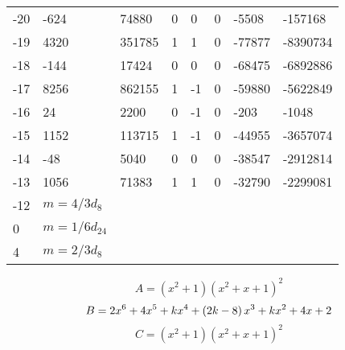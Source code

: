 \documentclass{amsart}
\begin{document}
\begin{longtable}{|l|l|l|lllll|}
-20&-624&74880&0&0&0&-5508&-157168\\
-19&4320&351785&1&1&0&-77877&-8390734\\
-18&-144&17424&0&0&0&-68475&-6892886\\
-17&8256&862155&1&-1&0&-59880&-5622849\\
-16&24&2200&0&-1&0&-203&-1048\\
-15&1152&113715&1&-1&0&-44955&-3657074\\
-14&-48&5040&0&0&0&-38547&-2912814\\
-13&1056&71383&1&1&0&-32790&-2299081\\
-12&$m=4/3d_{8}$&&\multicolumn{5}{c|}{}\\
0&$m=1/6d_{24}$&&\multicolumn{5}{c|}{}\\
4&$m=2/3d_{8}$&&\multicolumn{5}{c|}{}\\
\hline
\end{longtable}
$$A=(x^2
 + 1)(x^2
 + x
 + 1)^{2}$$
$$B=2\*x^6
 + 4\*x^5
 + k\*x^4
 + \left(2\*k
 - 8\right) \*x^3
 + k\*x^2
 + 4\*x
 + 2$$
$$C=(x^2
 + 1)(x^2
 + x
 + 1)^{2}$$
\end{document}
